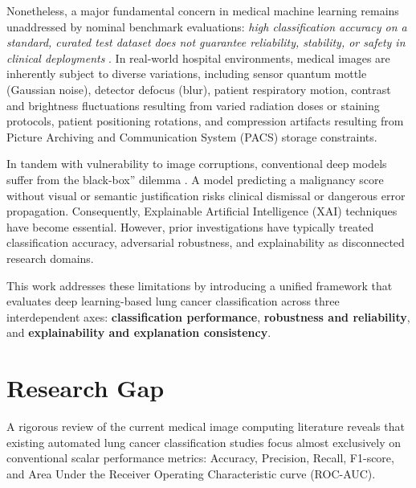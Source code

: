 \documentclass[conference]{IEEEtran}
\begin{document}
Nonetheless, a major fundamental concern in medical machine learning remains unaddressed by nominal benchmark evaluations: \textit{high classification accuracy on a standard, curated test dataset does not guarantee reliability, stability, or safety in clinical deployments} \cite{hendrycks2019benchmarking}. In real-world hospital environments, medical images are inherently subject to diverse variations, including sensor quantum mottle (Gaussian noise), detector defocus (blur), patient respiratory motion, contrast and brightness fluctuations resulting from varied radiation doses or staining protocols, patient positioning rotations, and compression artifacts resulting from Picture Archiving and Communication System (PACS) storage constraints.

In tandem with vulnerability to image corruptions, conventional deep models suffer from the black-box'' dilemma \cite{rudin2019stop}. A model predicting a malignancy score without visual or semantic justification risks clinical dismissal or dangerous error propagation. Consequently, Explainable Artificial Intelligence (XAI) techniques have become essential. However, prior investigations have typically treated classification accuracy, adversarial robustness, and explainability as disconnected research domains.

This work addresses these limitations by introducing a unified framework that evaluates deep learning-based lung cancer classification across three interdependent axes: \textbf{classification performance}, \textbf{robustness and reliability}, and \textbf{explainability and explanation consistency}.

\section{Research Gap}
\label{sec:research_gap}

A rigorous review of the current medical image computing literature reveals that existing automated lung cancer classification studies focus almost exclusively on conventional scalar performance metrics: Accuracy, Precision, Recall, F1-score, and Area Under the Receiver Operating Characteristic curve (ROC-AUC). 
\end{document}
